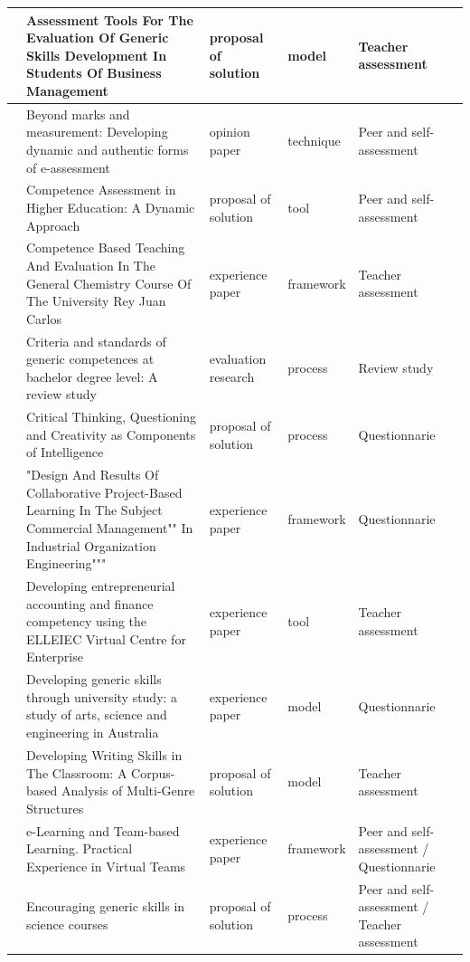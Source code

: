 \begin{landscape}
\begin{center}
\begin{longtable}{| m{2.5cm} | m{9cm} | m{4cm} | m{2.5cm} | m{3.5cm} |}
    \hline
    \cite{barbera2011assessment} & Assessment Tools For The Evaluation Of Generic Skills Development In Students Of Business Management & proposal of solution & model & Teacher assessment \\
    \hline
    \cite{mcloughlin2006beyond} & Beyond marks and measurement: Developing dynamic and authentic forms of e-assessment & opinion paper & technique & Peer and self-assessment \\
    \hline
    \cite{achcaoucaou2014competence} & Competence Assessment in Higher Education: A Dynamic Approach & proposal of solution & tool & Peer and self-assessment \\
    \hline
    \cite{prashar2010competence} & Competence Based Teaching And Evaluation In The General Chemistry Course Of The University Rey Juan Carlos & experience paper & framework & Teacher assessment \\
    \hline
    \cite{strijbos2015criteria} & Criteria and standards of generic competences at bachelor degree level: A review study & evaluation research & process & Review study \\
    \hline
    \cite{albergaria2011critical} & Critical Thinking, Questioning and Creativity as Components of Intelligence & proposal of solution & process & Questionnarie \\
    \hline
    \cite{barbera2011design} & "Design And Results Of Collaborative Project-Based Learning In The Subject Commercial Management"" In Industrial Organization Engineering""" & experience paper & framework & Questionnarie \\
    \hline
    \cite{ward2011developing} & Developing entrepreneurial accounting and finance competency using the ELLEIEC Virtual Centre for Enterprise & experience paper & tool & Teacher assessment \\
    \hline
    \cite{badcock2010developing} & Developing generic skills through university study: a study of arts, science and engineering in Australia & experience paper & model & Questionnarie \\
    \hline
    \cite{casan2015developing} & Developing Writing Skills in The Classroom: A Corpus-based Analysis of Multi-Genre Structures & proposal of solution & model & Teacher assessment \\
    \hline
    \cite{ficapal2015learning} & e-Learning and Team-based Learning. Practical Experience in Virtual Teams & experience paper & framework & Peer and self-assessment / Questionnarie \\
    \hline
    \cite{johnson2002encouraging} & Encouraging generic skills in science courses & proposal of solution & process & Peer and self-assessment / Teacher assessment \\

\end{longtable}
\end{center}
\end{landscape}
